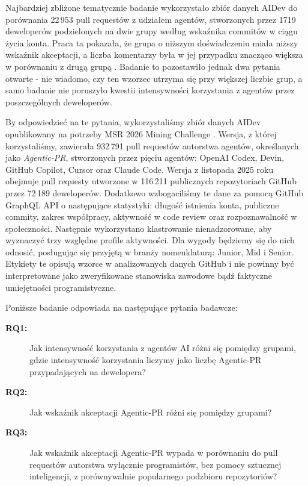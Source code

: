 Najbardziej zbliżone tematycznie badanie wykorzystało zbiór danych AIDev do porównania 22\,953 pull requestów z udziałem agentów, stworzonych przez 1719 deweloperów podzielonych na dwie grupy według wskaźnika commitów w ciągu życia konta. Praca ta pokazała, że grupa o niższym doświadczeniu miała niższy wskaźnik akceptacji, a liczba komentarzy była w jej przypadku znacząco większa w porównaniu z drugą grupą \cite{asdaque2026novice}. Badanie to pozostawiło jednak dwa pytania otwarte - nie wiadomo, czy ten wzorzec utrzyma się przy większej liczbie grup, a samo badanie nie poruszyło kwestii intensywności korzystania z agentów przez poszczególnych deweloperów.

By odpowiedzieć na te pytania, wykorzystaliśmy zbiór danych AIDev opublikowany na potrzeby MSR 2026 Mining Challenge \cite{li2026aidev}. Wersja, z której korzystaliśmy, zawierała 932\,791 pull requestów autorstwa agentów, określanych jako \emph{Agentic-PR}, stworzonych przez pięciu agentów: OpenAI Codex, Devin, GitHub Copilot, Cursor oraz Claude Code. Wersja z listopada 2025 roku obejmuje pull requesty utworzone w 116\,211 publicznych repozytoriach GitHub przez 72\,189 deweloperów. Dodatkowo wzbogaciliśmy te dane za pomocą GitHub GraphQL API o następujące statystyki: długość istnienia konta, publiczne commity, zakres współpracy, aktywność w code review oraz rozpoznawalność w społeczności. Następnie wykorzystano klastrowanie nienadzorowane, aby wyznaczyć trzy względne profile aktywności. Dla wygody będziemy się do nich odnosić, posługując się przyjętą w branży nomenklaturą: Junior, Mid i Senior. Etykiety te opisują wzorce w analizowanych danych GitHub i nie powinny być interpretowane jako zweryfikowane stanowiska zawodowe bądź faktyczne umiejętności programistyczne.

Poniższe badanie odpowiada na następujące pytania badawcze:

\begin{description}
    \item[\textbf{RQ1:}] Jak intensywność korzystania z agentów AI różni się pomiędzy grupami, gdzie intensywność korzystania liczymy jako liczbę Agentic-PR przypadających na dewelopera?

    \item[\textbf{RQ2:}] Jak wskaźnik akceptacji Agentic-PR różni się pomiędzy grupami?

    \item[\textbf{RQ3:}] Jak wskaźnik akceptacji Agentic-PR wypada w porównaniu do pull requestów autorstwa wyłącznie programistów, bez pomocy sztucznej inteligencji, z porównywalnie popularnego podzbioru repozytoriów?
\end{description}

